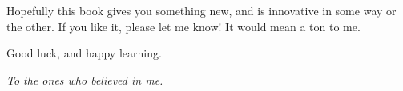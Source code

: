 Hopefully this book gives you something new, and is innovative in some way or the other. If you like it, please 
let me know! It would mean a ton to me.

Good luck, and happy learning.

\clearpage
\thispagestyle{empty}
    \vspace*{\fill}
    {\em \centering \hspace{3cm} To the ones who believed in me.}
    \vspace*{\fill}
